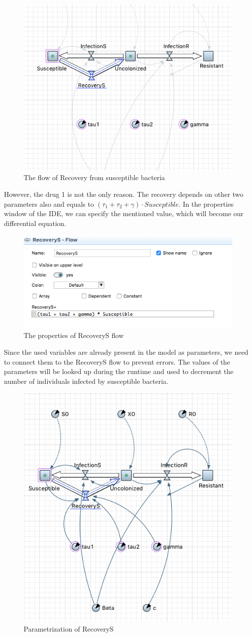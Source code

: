 \begin{figure}[H]
  \centering
  \includegraphics[height=0.5\textwidth]{img/screens/recovery/recovery6}
  \caption{The flow of Recovery from susceptible bacteria}
\end{figure}

However, the drug 1 is not the only reason. The recovery depends on other two parameters also and equals to $(\tau_1 + \tau_2 + \gamma) \cdot Susceptible$. In the properties window of the IDE, we can specify the mentioned value, which will become our differential equation.

\begin{figure}[H]
  \centering
  \includegraphics[height=0.3\textwidth]{img/screens/recovery/recovery5}
  \caption{The properties of RecoveryS flow}
\end{figure}

Since the used variables are already present in the model as parameters, we need to connect them to the RecoveryS flow to prevent errors. The values of the parameters will be looked up during the runtime and used to decrement the number of individuals infected by susceptible bacteria.

\begin{figure}[H]
  \centering
  \includegraphics[height=0.6\textwidth]{img/screens/recovery/recovery7}
  \caption{Parametrization of RecoveryS}
\end{figure}

